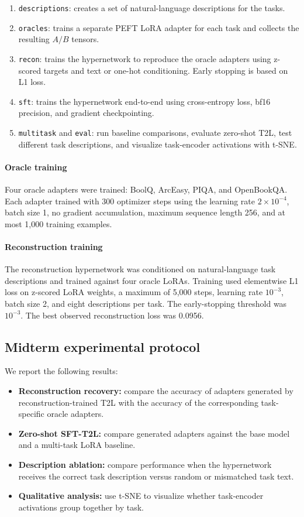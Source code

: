 \documentclass{article}
\begin{document}
\begin{enumerate}
  \item \texttt{descriptions}: creates a set of natural-language descriptions for the tasks.
  \item \texttt{oracles}: trains a separate PEFT LoRA adapter for each task and collects the resulting $A/B$ tensors.
  \item \texttt{recon}: trains the hypernetwork to reproduce the oracle adapters using z-scored targets and text or one-hot conditioning. Early stopping is based on L1 loss.
  \item \texttt{sft}: trains the hypernetwork end-to-end using cross-entropy loss, bf16 precision, and gradient checkpointing.
  \item \texttt{multitask} and \texttt{eval}: run baseline comparisons, evaluate zero-shot T2L, test different task descriptions, and visualize task-encoder activations with t-SNE.
\end{enumerate}

\paragraph{Oracle training}
Four oracle adapters were trained: BoolQ, ArcEasy, PIQA, and OpenBookQA. Each adapter trained with 300 optimizer steps using the learning rate $2\times10^{-4}$, batch size 1, no gradient accumulation, maximum sequence length 256, and at most 1,000 training examples.

\paragraph{Reconstruction training}
The reconstruction hypernetwork was conditioned on natural-language task descriptions and trained against four oracle LoRAs. Training used elementwise L1 loss on z-scored LoRA weights, a maximum of 5,000 steps, learning rate $10^{-3}$, batch size 2, and eight descriptions per task. The early-stopping threshold was $10^{-3}$. The best observed reconstruction loss was 0.0956.

\subsection{Midterm experimental protocol}

We report the following results:

\begin{itemize}
  \item \textbf{Reconstruction recovery:} compare the accuracy of adapters generated by reconstruction-trained T2L with the accuracy of the corresponding task-specific oracle adapters.
  \item \textbf{Zero-shot SFT-T2L:} compare generated adapters against the base model and a multi-task LoRA baseline.
  \item \textbf{Description ablation:} compare performance when the hypernetwork receives the correct task description versus random or mismatched task text.
  \item \textbf{Qualitative analysis:} use t-SNE to visualize whether task-encoder activations group together by task.
\end{itemize}
\end{document}
